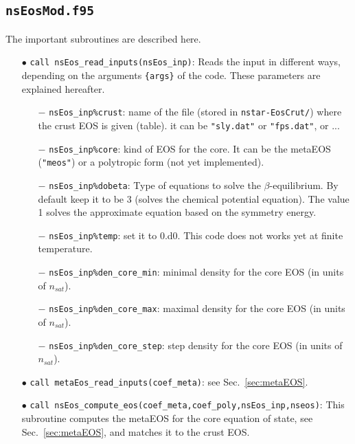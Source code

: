 \documentclass[11pt]{article}
\newcommand{\code}[1]{\colorbox{light-gray}{\mbox{\texttt{#1}}}}
\begin{document}
\subsection{\code{nsEosMod.f95}}

The important subroutines are described here.\\
\begin{enumerate}
\item[$\bullet$] \code{call nsEos\_read\_inputs(nsEos\_inp)}: Reads the input in different ways, depending on the arguments  \code{\{args\}} of the code. These parameters are explained hereafter.\\
\begin{enumerate}
\item[$-$] \code{nsEos\_inp\%crust}: name of the file (stored in \code{nstar-EosCrut/}) where the crust EOS is given (table). it can be \code{"sly.dat"} or \code{"fps.dat"}, or ...\\
\item[$-$] \code{nsEos\_inp\%core}: kind of EOS for the core. It can be the metaEOS (\code{"meos"}) or a polytropic form (not yet implemented). \\
\item[$-$] \code{nsEos\_inp\%dobeta}: Type of equations to solve the $\beta$-equilibrium. By default keep it to be 3 (solves the chemical potential equation). The value 1 solves the approximate equation based on the symmetry energy.\\
\item[$-$] \code{nsEos\_inp\%temp}: set it to 0.d0. This code does not works yet at finite temperature.\\
\item[$-$] \code{nsEos\_inp\%den\_core\_min}: minimal density for the core EOS (in units of $n_{sat}$).\\
\item[$-$] \code{nsEos\_inp\%den\_core\_max}: maximal density for the core EOS (in units of $n_{sat}$).\\
\item[$-$] \code{nsEos\_inp\%den\_core\_step}: step density for the core EOS (in units of $n_{sat}$).\\
\end{enumerate}
\item[$\bullet$] \code{call metaEos\_read\_inputs(coef\_meta)}: see Sec.~\ref{sec:metaEOS}. 
\item[$\bullet$] \code{call nsEos\_compute\_eos(coef\_meta,coef\_poly,nsEos\_inp,nseos)}: This subroutine computes the metaEOS for the core equation of state, see Sec.~\ref{sec:metaEOS}, and matches it to the crust EOS.

\end{enumerate}
\end{document}
